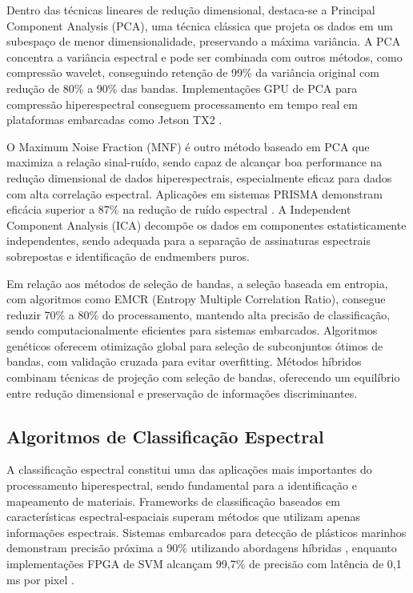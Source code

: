 Dentro das técnicas lineares de redução dimensional, destaca-se a Principal
Component Analysis (PCA), uma técnica clássica que projeta os dados em um
subespaço de menor dimensionalidade, preservando a máxima variância. A PCA
concentra a variância espectral e pode ser combinada com outros métodos, como
compressão wavelet, conseguindo retenção de 99\% da variância original com
redução de 80\% a 90\% das bandas. Implementações GPU de PCA para compressão
hiperespectral conseguem processamento em tempo real em plataformas embarcadas
como Jetson TX2 \cite{Diaz2019}.

O Maximum Noise Fraction (MNF) é outro método baseado em PCA que maximiza a
relação sinal-ruído, sendo capaz de alcançar boa performance na redução
dimensional de dados hiperespectrais, especialmente eficaz para dados com alta
correlação espectral. Aplicações em sistemas PRISMA demonstram eficácia superior
a 87\% na redução de ruído espectral \cite{Corbari2023}. A Independent Component
Analysis (ICA) decompõe os dados em componentes estatisticamente independentes,
sendo adequada para a separação de assinaturas espectrais sobrepostas e
identificação de endmembers puros.

Em relação aos métodos de seleção de bandas, a seleção baseada em entropia, com
algoritmos como EMCR (Entropy Multiple Correlation Ratio), consegue reduzir 70\%
a 80\% do processamento, mantendo alta precisão de classificação, sendo
computacionalmente eficientes para sistemas embarcados. Algoritmos genéticos
oferecem otimização global para seleção de subconjuntos ótimos de bandas, com
validação cruzada para evitar overfitting. Métodos híbridos combinam técnicas de
projeção com seleção de bandas, oferecendo um equilíbrio entre redução
dimensional e preservação de informações discriminantes.

\subsection{Algoritmos de Classificação Espectral}
\label{subsec:classificacao_espectral}

A classificação espectral constitui uma das aplicações mais importantes do
processamento hiperespectral, sendo fundamental para a identificação e
mapeamento de materiais. Frameworks de classificação baseados em características
espectral-espaciais superam métodos que utilizam apenas informações espectrais.
Sistemas embarcados para detecção de plásticos marinhos demonstram precisão
próxima a 90\% utilizando abordagens híbridas \cite{Alboody2023}, enquanto
implementações FPGA de SVM alcançam 99,7\% de precisão com latência de 0,1 ms por
pixel \cite{Martins2019}.

